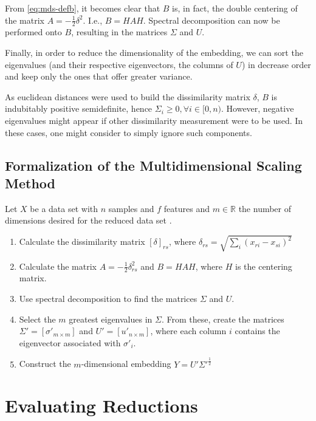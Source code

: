 From \ref{eq:mds-defb}, it becomes clear that $B$ is, in fact, the double centering of the matrix $A=-\frac{1}{2}\delta^2$. I.e., $B=HAH$. Spectral decomposition can now be performed onto $B$, resulting in the matrices $\Sigma$ and $U$.

Finally, in order to reduce the dimensionality of the embedding, we can sort the eigenvalues (and their respective eigenvectors, the columns of $U$) in decrease order and keep only the ones that offer greater variance.

\begin{remark}
	As euclidean distances were used to build the dissimilarity matrix $\delta$, $B$ is indubitably positive semidefinite, hence $\Sigma_i \ge 0, \forall i\in [0, n)$. However, negative eigenvalues might appear if other dissimilarity measurement were to be used. In these cases, one might consider to simply ignore such components.
\end{remark}

\subsection{Formalization of the Multidimensional Scaling Method}

Let $X$ be a data set with $n$ samples and $f$ features and $m\in\mathbb{R}$ the number of dimensions desired for the reduced data set \cite{cox2001}.

\begin{enumerate}
	\item Calculate the dissimilarity matrix $[\delta]_{rs}$, where $\delta_{rs} = \sqrt{\sum_i (x_{ri} - x_{si})^2}$
	\item Calculate the matrix $A=-\frac{1}{2}\delta_{rs}^2$ and $B=HAH$, where $H$ is the centering matrix.

	\item Use spectral decomposition to find the matrices $\Sigma$ and $U$.

	\item Select the $m$ greatest eigenvalues in $\Sigma$. From these, create the matrices $\Sigma'=[\sigma'_{m\times m}]$ and $U'=[u'_{n\times m}]$, where each column $i$ contains the eigenvector associated with $\sigma'_i$.

	\item Construct the $m$-dimensional embedding $Y=U'\Sigma'^{\frac{1}{2}}$
\end{enumerate}

\section{Evaluating Reductions}

